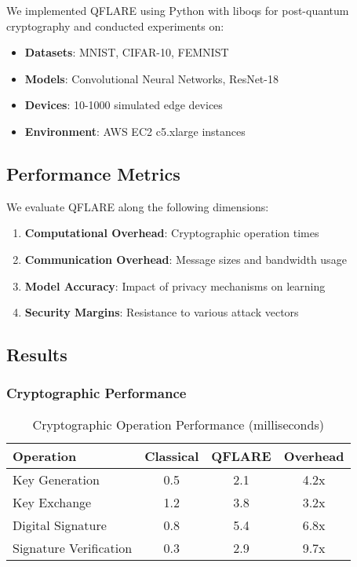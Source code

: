 \documentclass[journal]{IEEEtran}
\begin{document}
We implemented QFLARE using Python with liboqs for post-quantum cryptography and conducted experiments on:

\begin{itemize}
\item \textbf{Datasets}: MNIST, CIFAR-10, FEMNIST
\item \textbf{Models}: Convolutional Neural Networks, ResNet-18
\item \textbf{Devices}: 10-1000 simulated edge devices
\item \textbf{Environment}: AWS EC2 c5.xlarge instances
\end{itemize}

\subsection{Performance Metrics}

We evaluate QFLARE along the following dimensions:

\begin{enumerate}
\item \textbf{Computational Overhead}: Cryptographic operation times
\item \textbf{Communication Overhead}: Message sizes and bandwidth usage
\item \textbf{Model Accuracy}: Impact of privacy mechanisms on learning
\item \textbf{Security Margins}: Resistance to various attack vectors
\end{enumerate}

\subsection{Results}

\subsubsection{Cryptographic Performance}

\begin{table}[h]
\centering
\caption{Cryptographic Operation Performance (milliseconds)}
\begin{tabular}{|l|c|c|c|}
\hline
\textbf{Operation} & \textbf{Classical} & \textbf{QFLARE} & \textbf{Overhead} \\
\hline
Key Generation & 0.5 & 2.1 & 4.2x \\
Key Exchange & 1.2 & 3.8 & 3.2x \\
Digital Signature & 0.8 & 5.4 & 6.8x \\
Signature Verification & 0.3 & 2.9 & 9.7x \\
\hline
\end{tabular}
\end{table}
\end{document}
